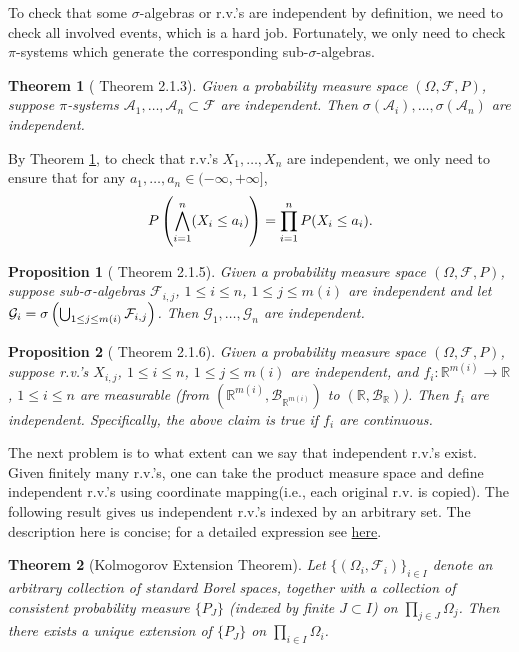 \documentclass[openany]{book}
\newtheorem{proposition}{Proposition}[chapter]
\newtheorem{theorem}{Theorem}[chapter]
\theoremstyle{definition}
\theoremstyle{remark}
\begin{document}
To check that some $\sigma$-algebras or r.v.'s are independent by definition, we need to check all involved events, which is a hard job. Fortunately, we only need to check $\pi$-systems which generate the corresponding sub-$\sigma$-algebras.
\begin{theorem}[\cite{D10} Theorem 2.1.3]\label{thm:indepPiSystems}
    Given a probability measure space $(\Omega,\mathcal{F},P)$, suppose $\pi$-systems $\mathcal{A}_1,\ldots,\mathcal{A}_n\subset \mathcal{F}$ are independent. Then $\sigma(\mathcal{A}_i),\ldots,\sigma(\mathcal{A}_n)$ are independent.
\end{theorem}
By Theorem \ref{thm:indepPiSystems}, to check that r.v.'s $X_1,\ldots,X_n$ are independent, we only need to ensure that for any $a_1,\ldots,a_n\in(-\infty,+\infty]$,
\begin{equation*}
    P\del{\bigwedge_{i=1}^n(X_i\le a_i)}=\prod_{i=1}^n P(X_i\le a_i).
\end{equation*}
\begin{proposition}[\cite{D10} Theorem 2.1.5]
    Given a probability measure space $(\Omega,\mathcal{F},P)$, suppose sub-$\sigma$-algebras $\mathcal{F}_{i,j}$, $1\le i\le n$, $1\le j\le m(i)$ are independent and let $\mathcal{G}_i=\sigma\del{\bigcup_{1\le j\le m(i)} \mathcal{F}_{i,j}}$. Then $\mathcal{G}_1,\ldots,\mathcal{G}_n$ are independent.
\end{proposition}
\begin{proposition}[\cite{D10} Theorem 2.1.6]
    Given a probability measure space $(\Omega,\mathcal{F},P)$, suppose r.v.'s $X_{i,j}$, $1\le i\le n$, $1\le j\le m(i)$ are independent, and $f_i:\mathbb{R}^{m(i)}\to \mathbb{R}$, $1\le i\le n$ are measurable (from $(\mathbb{R}^{m(i)},\mathcal{B}_{\mathbb{R}^{m(i)}})$ to $(\mathbb{R},\mathcal{B}_{\mathbb{R}})$). Then $f_i$ are independent. Specifically, the above claim is true if $f_i$ are continuous.
\end{proposition}

The next problem is to what extent can we say that independent r.v.'s exist. Given finitely many r.v.'s, one can take the product measure space and define independent r.v.'s using coordinate mapping(i.e., each original r.v. is copied). The following result gives us independent r.v.'s indexed by an arbitrary set. The description here is concise; for a detailed expression see \href{http://www.math.nus.edu.sg/~matsr/ProbI/Lecture2.pdf}{here}.
\begin{theorem}[Kolmogorov Extension Theorem]
    Let $\{(\Omega_i,\mathcal{F}_i)\}_{i\in I}$ denote an arbitrary collection of standard Borel spaces, together with a collection of consistent probability measure $\{P_J\}$ (indexed by finite $J\subset I$) on $\prod_{j\in J}\Omega_j$. Then there exists a unique extension of $\{P_J\}$ on $\prod_{i\in I}\Omega_i$.
\end{theorem}
\end{document}
